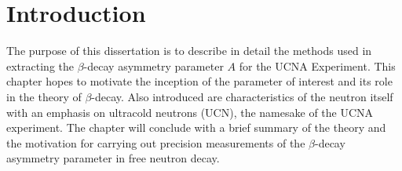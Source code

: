\chapter{Introduction}
\label{ch:Introduction}

The purpose of this dissertation is to describe in detail
the methods used in extracting the $\beta$-decay asymmetry parameter
$A$
for the UCNA Experiment. This chapter hopes to motivate the inception
of the parameter of interest and its role in the theory of $\beta$-decay.
Also introduced are characteristics of the neutron itself with an
emphasis on ultracold neutrons (UCN), the namesake of the UCNA experiment.
The chapter will conclude with a brief summary of the
theory and the motivation for carrying out precision measurements of the
$\beta$-decay asymmetry parameter in free neutron decay.

